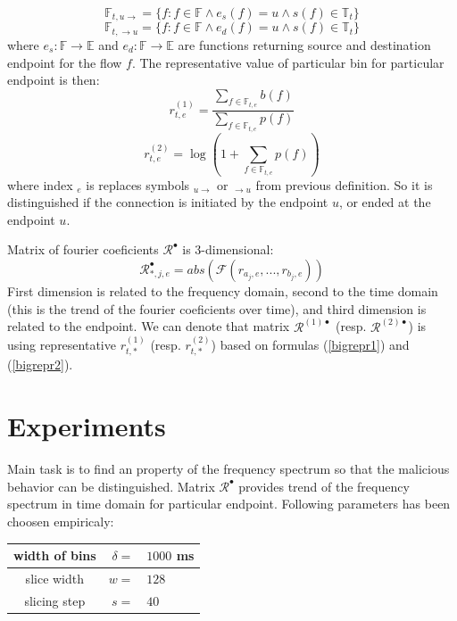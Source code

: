 \documentclass[a4paper,journal]{IEEEtran}
\begin{document}
\begin{equation}
\mathbb{F}_{t,u \rightarrow} = \{f : f \in \mathbb{F} \wedge e_{s}(f) = u \wedge s(f) \in \mathbb{T}_t \}
\end{equation}
\begin{equation}
\mathbb{F}_{t, \rightarrow u} = \{f : f \in \mathbb{F} \wedge e_{d}(f) = u \wedge s(f) \in \mathbb{T}_t \}
\end{equation}
where $e_{s}:\mathbb{F}\rightarrow \mathbb{E}$ and
$e_{d}:\mathbb{F}\rightarrow \mathbb{E}$ 
are functions returning source and destination endpoint for the 
flow $f$.
The representative value of particular bin for particular endpoint is 
then:
\begin{equation}\label{bigrepr1}
r_{t,e}^{(1)} = \frac{\sum\limits_{f\in \mathbb{F}_{t,e}}b(f)}{\sum\limits_{f\in \mathbb{F}_{t,e}}p(f)}
\end{equation}
\begin{equation}\label{bigrepr2}
r_{t,e}^{(2)} = \log(1+\sum\limits_{f\in \mathbb{F}_{t,e}}p(f))
\end{equation}
where index ${}_e$ is replaces symbols ${}_{u\rightarrow}$ or 
${}_{\rightarrow u}$ from previous definition. So it is distinguished 
if the connection is initiated by the endpoint $u$, or ended at the
endpoint $u$.

Matrix of fourier coeficients $\mathcal{R}^\bullet$ is 3-dimensional:
\begin{equation}\label{bigmatrix}
\mathcal{R}^\bullet_{*,j,e} = abs(\mathcal{F}(r_{a_j,e}, ..., r_{b_j,e}))
\end{equation}
First dimension is related to the frequency domain, second to the time domain 
(this is the trend of the fourier coeficients over time), 
and third dimension is related to the endpoint.
We can denote that matrix $\mathcal{R}^{(1)\bullet}$ (resp. $\mathcal{R}^{(2)\bullet}$)
is using representative $r_{t,*}^{(1)}$ (resp. $r_{t,*}^{(2)}$) based on formulas
(\ref{bigrepr1}) and (\ref{bigrepr2}).

\section{Experiments}
Main task is to find an property of the frequency spectrum so that the malicious behavior
can be distinguished. Matrix $\mathcal{R}^\bullet$ provides trend of the frequency spectrum
in time domain for particular endpoint.
Following parameters has been choosen empiricaly:

\begin{center}
\begin{tabular}{c|rl}
width of bins & $\delta =$ & $1000$ ms \\ \hline
slice width & $w =$ & $128$ \\ \hline
slicing step & $s=$ & $40$ \\
\end{tabular}
\end{center}
\end{document}

